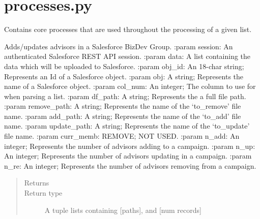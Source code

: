 \documentclass[letterpaper,10pt,english]{sphinxmanual}
\begin{document}
\label{\detokenize{index:module-ListManagement.utility.processes}}

\section{processes.py}
\label{\detokenize{index:processes-py}}
Contains core processes that are used
throughout the processing of a given list.

\begin{fulllineitems}
\label{\detokenize{index:ListManagement.utility.processes.bdg_upload}}
Adds/updates advisors in a Salesforce BizDev Group.
:param session: An authenticated Salesforce REST API session.
:param data: A list containing the data which will be uploaded to Salesforce.
:param obj\_id: An 18-char string; Represents an Id of a Salesforce object.
:param obj: A string; Represents the name of a Salesforce object.
:param col\_num: An integer; The column to use for when parsing a list.
:param df\_path: A string; Represents the a full file path.
:param remove\_path: A string; Represents the name of the ‘to\_remove’ file name.
:param add\_path: A string; Represents the name of the ‘to\_add’ file name.
:param update\_path: A string; Represents the name of the ‘to\_update’ file name.
:param curr\_memb: REMOVE; NOT USED.
:param n\_add: An integer; Represents the number of advisors adding to a campaign.
:param n\_up: An integer; Represents the number of advisors updating in a campaign.
:param n\_re: An integer; Represents the number of advisors removing from a campaign.
\begin{quote}\begin{description}
\item[{Returns}] \leavevmode


\item[{Return type}] \leavevmode
A tuple lists containing {[}paths{]}, and {[}num records{]}

\end{description}\end{quote}

\end{fulllineitems}
\end{document}
